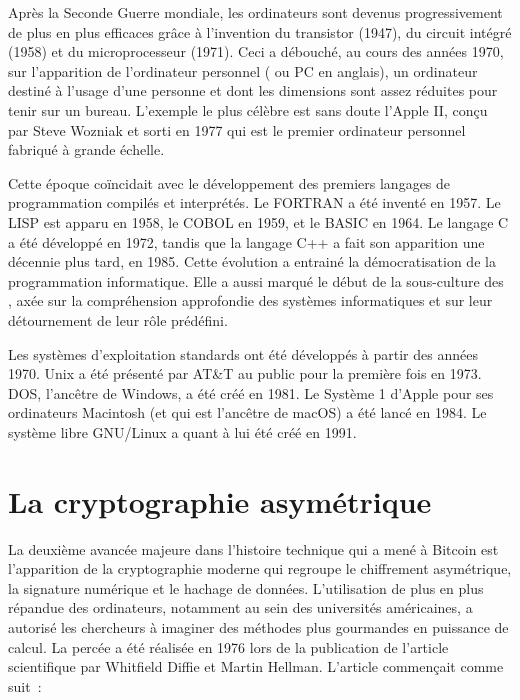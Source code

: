 Après la Seconde Guerre mondiale, les ordinateurs sont devenus progressivement de plus en plus efficaces grâce à l'invention du transistor (1947), du circuit intégré (1958) et du microprocesseur (1971). Ceci a débouché, au cours des années 1970, sur l'apparition de l'ordinateur personnel ( ou PC en anglais), un ordinateur destiné à l'usage d'une personne et dont les dimensions sont assez réduites pour tenir sur un bureau. L'exemple le plus célèbre est sans doute l'Apple II, conçu par Steve Wozniak et sorti en 1977 qui est le premier ordinateur personnel fabriqué à grande échelle.

Cette époque coïncidait avec le développement des premiers langages de programmation compilés et interprétés. Le FORTRAN a été inventé en 1957. Le LISP est apparu en 1958, le COBOL en 1959, et le BASIC en 1964. Le langage C a été développé en 1972, tandis que la langage C++ a fait son apparition une décennie plus tard, en 1985. Cette évolution a entrainé la démocratisation de la programmation informatique. Elle a aussi marqué le début de la sous-culture des , axée sur la compréhension approfondie des systèmes informatiques et sur leur détournement de leur rôle prédéfini. %

Les systèmes d'exploitation standards ont été développés à partir des années 1970. Unix a été présenté par AT\&T au public pour la première fois en 1973. DOS, l'ancêtre de Windows, a été créé en 1981. Le Système 1 d'Apple pour ses ordinateurs Macintosh (et qui est l'ancêtre de macOS) a été lancé en 1984. Le système libre GNU/Linux a quant à lui été créé en 1991.

\section*{La cryptographie asymétrique} %

La deuxième avancée majeure dans l'histoire technique qui a mené à Bitcoin est l'apparition de la cryptographie moderne qui regroupe le chiffrement asymétrique, la signature numérique et le hachage de données. L'utilisation de plus en plus répandue des ordinateurs, notamment au sein des universités américaines, a autorisé les chercheurs à imaginer des méthodes plus gourmandes en puissance de calcul. La percée a été réalisée en 1976 lors de la publication de l'article scientifique  par Whitfield Diffie et Martin Hellman. L'article commençait comme suit~:

